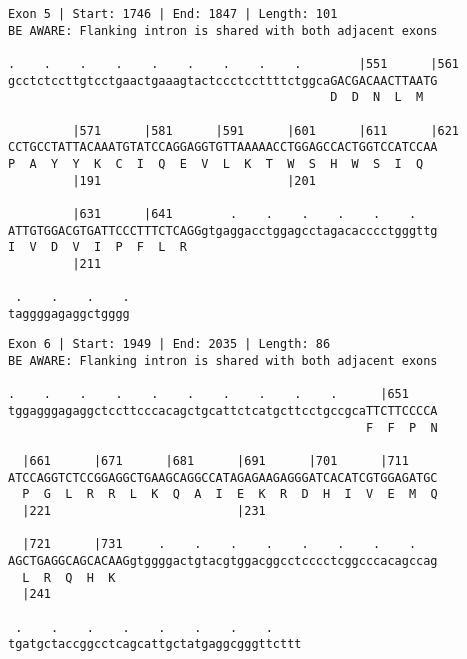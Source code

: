 \documentclass{article}
\begin{document}
\newpage
\begin{Verbatim}
Exon 5 | Start: 1746 | End: 1847 | Length: 101
BE AWARE: Flanking intron is shared with both adjacent exons
 
.    .    .    .    .    .    .    .    .        |551      |561
gcctctccttgtcctgaactgaaagtactccctccttttctggcaGACGACAACTTAATG
                                             D  D  N  L  M  
  
         |571      |581      |591      |601      |611      |621
CCTGCCTATTACAAATGTATCCAGGAGGTGTTAAAAACCTGGAGCCACTGGTCCATCCAA
P  A  Y  Y  K  C  I  Q  E  V  L  K  T  W  S  H  W  S  I  Q  
         |191                          |201                 
  
         |631      |641        .    .    .    .    .    .   
ATTGTGGACGTGATTCCCTTTCTCAGGgtgaggacctggagcctagacacccctgggttg
I  V  D  V  I  P  F  L  R                                   
         |211                                               
  
 .    .    .    .
taggggagaggctgggg
\end{Verbatim}
\newpage
\begin{Verbatim}
Exon 6 | Start: 1949 | End: 2035 | Length: 86
BE AWARE: Flanking intron is shared with both adjacent exons
 
.    .    .    .    .    .    .    .    .    .      |651    
tggagggagaggctccttcccacagctgcattctcatgcttcctgccgcaTTCTTCCCCA
                                                  F  F  P  N
  
  |661      |671      |681      |691      |701      |711    
ATCCAGGTCTCCGGAGGCTGAAGCAGGCCATAGAGAAGAGGGATCACATCGTGGAGATGC
  P  G  L  R  R  L  K  Q  A  I  E  K  R  D  H  I  V  E  M  Q
  |221                          |231                        
  
  |721      |731     .    .    .    .    .    .    .    .   
AGCTGAGGCAGCACAAGgtggggactgtacgtggacggcctcccctcggcccacagccag
  L  R  Q  H  K                                             
  |241                                                      
  
 .    .    .    .    .    .    .    .    
tgatgctaccggcctcagcattgctatgaggcgggttcttt
\end{Verbatim}
\newpage
\end{document}
